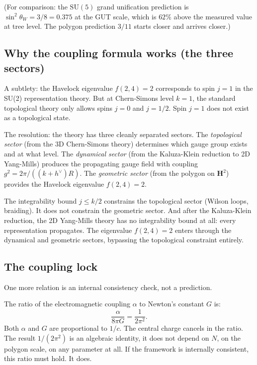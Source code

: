 (For comparison: the $\mathrm{SU}(5)$ grand unification prediction is
$\sin^2\theta_W = 3/8 = 0.375$ at the GUT scale, which is $62\%$ above
the measured value at tree level. The polygon prediction $3/11$ starts
closer and arrives closer.)

\subsection*{Why the coupling formula works (the three sectors)}

A subtlety: the Havelock eigenvalue $f(2,4) = 2$ corresponds to
spin $j = 1$ in the SU(2) representation theory. But at Chern-Simons
level $k = 1$, the standard topological theory only allows spins
$j = 0$ and $j = 1/2$. Spin $j = 1$ does not exist as a topological
state.

The resolution: the theory has three cleanly separated sectors.
The \emph{topological sector} (from the 3D Chern-Simons theory)
determines which gauge group exists and at what level.
The \emph{dynamical sector} (from the Kaluza-Klein reduction to
2D Yang-Mills) produces the propagating gauge field with coupling
$g^2 = 2\pi/((k + h^\vee) R)$.
The \emph{geometric sector} (from the polygon on $\mathbf{H}^2$)
provides the Havelock eigenvalue $f(2,4) = 2$.

The integrability bound $j \le k/2$ constrains the topological
sector (Wilson loops, braiding). It does not constrain the geometric
sector. And after the Kaluza-Klein reduction, the 2D Yang-Mills
theory has no integrability bound at all: every representation
propagates. The eigenvalue $f(2,4) = 2$ enters through the
dynamical and geometric sectors, bypassing the topological
constraint entirely.

\subsection*{The coupling lock}

One more relation is an internal consistency check, not a prediction.

The ratio of the electromagnetic coupling $\alpha$ to Newton's constant
$G$ is:
\[
  \frac{\alpha}{8\pi G} = \frac{1}{2\pi^2}.
\]
Both $\alpha$ and $G$ are proportional to $1/c$. The central charge
cancels in the ratio. The result $1/(2\pi^2)$ is an algebraic
identity, it does not depend on $N$, on the polygon scale, on any
parameter at all. If the framework is internally consistent, this
ratio must hold. It does.

